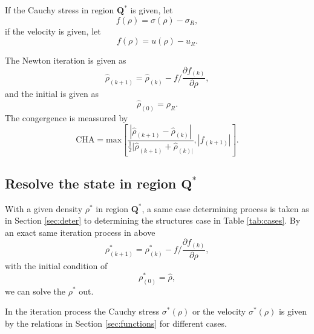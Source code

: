 \documentclass[review]{elsarticle}
\begin{document}
If the Cauchy stress  in region $\mathbf{Q}^*$ is given, let
\begin{equation}
  f(\rho) = \sigma(\rho) -\sigma_R,
\end{equation}
if the velocity is given, let
\begin{equation}
  f(\rho) = u(\rho) -u_R.
\end{equation}

The  Newton iteration is given as
\begin{equation}
  \hat{\rho}_{(k+1)} = \hat{\rho}_{(k)}- f/\frac{\partial f_{(k)}}{\partial \rho},
\end{equation}
and the initial is given as 
\begin{equation}
  \hat{\rho}_{(0)} = \rho_R.
\end{equation}
The  congergence is meassured by
\begin{equation}
  \text{CHA} = \text{max} \left[\frac{|\hat{\rho}_{(k+1)}-\hat{\rho}_{(k)}|}{\frac{1}{2}|\hat{\rho}_{(k+1)}+\hat{\rho}_{(k)|}},|f_{(k+1)}|\right].
\end{equation}
\subsection{Resolve the state in region $\mathbf{Q}^*$}
With a given density $\rho^*$ in region $\mathbf{Q}^*$, a same case determining process is taken as in Section \ref{sec:deter} to determining the structures case in Table \ref{tab:cases}.  By  an exact same iteration process in above   
\begin{equation}
 \rho^*_{(k+1)} = \rho^*_{(k)}- f/\frac{\partial f_{(k)}}{\partial \rho},
\end{equation}
with the initial condition of 
\begin{equation}
  \rho^*_{(0)} = \hat{\rho},
\end{equation}
we can solve the $\rho^*$ out. 

In the iteration process the Cauchy stress $\sigma^*(\rho)$ or the velocity $\sigma^*(\rho)$ is given by the relations in Section \ref{sec:functions} for different cases.
\end{document}
